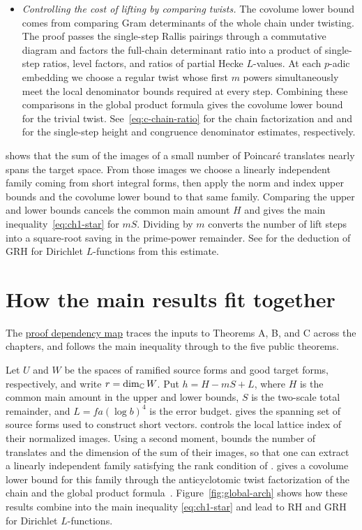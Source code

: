 \begin{itemize}
\item \emph{Controlling the cost of lifting by comparing twists.} The covolume lower bound comes from comparing Gram determinants of the whole chain under twisting. The proof passes the single-step Rallis pairings through a commutative diagram and factors the full-chain determinant ratio into a product of single-step ratios, level factors, and ratios of partial Hecke $L$-values. At each $p$-adic embedding we choose a regular twist whose first $m$ powers simultaneously meet the local denominator bounds required at every step. Combining these comparisons in the global product formula gives the covolume lower bound for the trivial twist. See~\eqref{eq:c-chain-ratio} for the chain factorization and  and  for the single-step height and congruence denominator estimates, respectively.
\end{itemize}

 shows that the sum of the images of a small number of Poincaré translates nearly spans the target space. From those images we choose a linearly independent family coming from short integral forms, then apply the norm and index upper bounds and the covolume lower bound to that same family. Comparing the upper and lower bounds cancels the common main amount $H$ and gives the main inequality~\eqref{eq:ch1-star} for $mS$. Dividing by $m$ converts the number of lift steps into a square-root saving in the prime-power remainder. See  for the deduction of GRH for Dirichlet $L$-functions from this estimate.

\section*{How the main results fit together}

The \hyperref[page:proof-dependencies]{proof dependency map} traces the inputs to Theorems A, B, and C across the chapters, and follows the main inequality through to the five public theorems.

Let $U$ and $W$ be the spaces of ramified source forms and good target forms, respectively, and write $r=\dim_{\mathbb{C}}W$. Put $h=H-mS+L$, where $H$ is the common main amount in the upper and lower bounds, $S$ is the two-scale total remainder, and $L=fa(\log b)^4$ is the error budget.  gives the spanning set of source forms used to construct short vectors.  controls the local lattice index of their normalized images. Using a second moment,  bounds the number of translates and the dimension of the sum of their images, so that one can extract a linearly independent family satisfying the rank condition of .  gives a covolume lower bound for this family through the anticyclotomic twist factorization of the chain and the global product formula~\cite{BombieriGubler2006}. Figure~\ref{fig:global-arch} shows how these results combine into the main inequality \eqref{eq:ch1-star} and lead to RH and GRH for Dirichlet $L$-functions.

